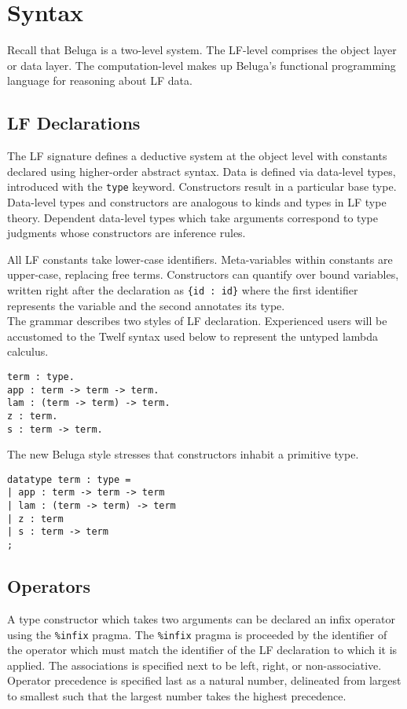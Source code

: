 \documentclass[11pt]{article}
\begin{document}

\section{Syntax}

Recall that Beluga is a two-level system. The LF-level comprises the object layer or data layer. The computation-level makes up Beluga's functional programming language for reasoning about LF data.

\subsection{LF Declarations}
The LF signature defines a deductive system at the object level with constants declared using higher-order abstract syntax. Data is defined via data-level types, introduced with the \texttt{type} keyword. Constructors result in a particular base type. Data-level types and constructors are analogous to kinds and types in LF type theory. Dependent data-level types which take arguments correspond to type judgments whose constructors are inference rules.

All LF constants take lower-case identifiers. Meta-variables within constants are upper-case, replacing free terms. Constructors can quantify over bound variables, written right after the declaration as \texttt{\{id : id\}} where the first identifier represents the variable and the second annotates its type. \\

The grammar describes two styles of LF declaration. Experienced users will be accustomed to the Twelf syntax used below to represent the untyped lambda calculus.
\begin{verbatim}
term : type.
app : term -> term -> term.
lam : (term -> term) -> term.
z : term.
s : term -> term.
\end{verbatim}

The new Beluga style stresses that constructors inhabit a primitive type.
\begin{verbatim}
datatype term : type =
| app : term -> term -> term
| lam : (term -> term) -> term
| z : term
| s : term -> term
;
\end{verbatim}

\subsection{Operators}
A type constructor which takes two arguments can be declared an infix operator using the \texttt{\%infix} pragma. The \texttt{\%infix} pragma is proceeded by the identifier of the operator which must match the identifier of the LF declaration to which it is applied. The associations is specified next to be left, right, or non-associative. Operator precedence is specified last as a natural number, delineated from largest to smallest such that the largest number takes the highest precedence.
\end{document}
